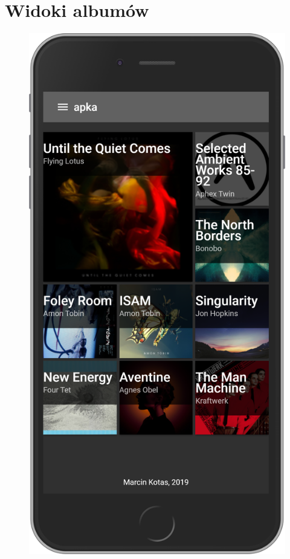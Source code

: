 \section{Widoki albumów}
	\begin{figure}[H]
		\centering
		\begin{minipage}{.5\textwidth}
			\includegraphics[width=0.9\linewidth]{rys06/explore.png}
		\end{minipage}%

\end{figure}
